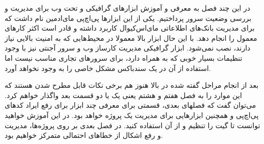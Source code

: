 در این چند فصل به معرفی و آموزش ابزارهای گرافیکی و تحت وب برای مدیریت و بررسی وضعیت سرور پرداختیم. یکی از این ابزارها پی‌اچ‌پی مای‌ادمین نام داشت که برای مدیریت بانک‌های اطلاعاتی مای‌اس‌کیوال کاربرد داشته و قادر است اکثر کارهای معمول را انجام دهد. با این حال ابزار بالا معمولا در محیط‌هایی که به امنیت بالایی نیاز دارند، نصب نمی‌شود. ابزار گرافیکی مدیریت کارساز وب و سرور آجنتی نیز با وجود تنظیمات بسیار خوبی که به همراه دارد، برای سرورهای تجاری مناسب نیست اما استفاده از آن در یک سندباکس مشکل خاصی را به وجود نخواهد آورد.

بعد از انجام مراحل گفته شده در بالا هنوز هم برخی نکات قابل مطرح شدن هستند که این موارد را به فصل هفتم و هشتم یعنی یک یا دو قسمت بعد واگذار خواهم کرد. می‌توان گفت که فصلهای بعدی، قسمتی برای معرفی چند ابزار برای رفع ایراد کدهای پی‌اچ‌پی و همچنین ابزارهایی برای مدیریت یک پروژه خواهد بود. در این آموزش خواهید توانست تا گیت را تنظیم و از آن استفاده کنید. در فصل بعدی بر روی پروژه‌ها، مدیریت و رفع اشکال از خطاهای احتمالی متمرکز خواهیم بود.